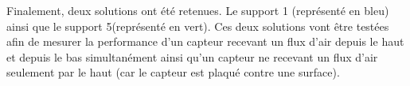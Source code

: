 Finalement, deux solutions ont été retenues. Le support 1 (représenté en bleu) ainsi que le support 5(représenté en vert). Ces deux solutions vont être testées afin de mesurer la
performance d'un capteur recevant un flux d'air depuis le haut et depuis le bas simultanément ainsi qu'un capteur ne recevant un flux
d'air seulement par le haut (car le capteur est plaqué contre une surface).